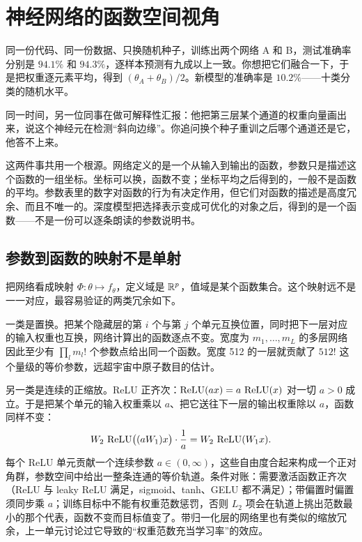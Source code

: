 \section{神经网络的函数空间视角}
\label{sec:14-Deep-Learning/10-Interpretability-Mathematics/01}

同一份代码、同一份数据、只换随机种子，训练出两个网络 A 和 B，测试准确率分别是 \(94.1\%\) 和 \(94.3\%\)，逐样本预测有九成以上一致。你想把它们融合一下，于是把权重逐元素平均，得到 \((\theta_A+\theta_B)/2\)。新模型的准确率是 \(10.2\%\)——十类分类的随机水平。

同一时间，另一位同事在做可解释性汇报：他把第三层某个通道的权重向量画出来，说这个神经元在检测``斜向边缘''。你追问换个种子重训之后哪个通道还是它，他答不上来。

这两件事共用一个根源。网络定义的是一个从输入到输出的函数，参数只是描述这个函数的一组坐标。坐标可以换，函数不变；坐标平均之后得到的，一般不是函数的平均。参数表里的数字对函数的行为有决定作用，但它们对函数的描述是高度冗余、而且不唯一的。深度模型把选择表示变成可优化的对象之后，得到的是一个函数——不是一份可以逐条朗读的参数说明书。

\subsection{参数到函数的映射不是单射}

把网络看成映射 \(\Phi:\theta\mapsto f_\theta\)，定义域是 \(\mathbb{R}^p\)，值域是某个函数集合。这个映射远不是一一对应，最容易验证的两类冗余如下。

一类是置换。把某个隐藏层的第 \(i\) 个与第 \(j\) 个单元互换位置，同时把下一层对应的输入权重也互换，网络计算出的函数逐点不变。宽度为 \(m_1,\dots,m_{L}\) 的多层网络因此至少有 \(\prod_l m_l!\) 个参数点给出同一个函数。宽度 512 的一层就贡献了 \(512!\) 这个量级的等价参数，远超宇宙中原子数目的估计。

另一类是连续的正缩放。ReLU 正齐次：\(\operatorname{ReLU}(ax)=a\,\operatorname{ReLU}(x)\) 对一切 \(a>0\) 成立。于是把某个单元的输入权重乘以 \(a\)、把它送往下一层的输出权重除以 \(a\)，函数同样不变：
\[
W_2\,\operatorname{ReLU}\bigl((aW_1)x\bigr)\cdot\frac1a=W_2\,\operatorname{ReLU}(W_1x).
\]
每个 ReLU 单元贡献一个连续参数 \(a\in(0,\infty)\)，这些自由度合起来构成一个正对角群，参数空间中给出一整条连通的等价轨道。条件对账：需要激活函数正齐次（ReLU 与 leaky ReLU 满足，sigmoid、tanh、GELU 都不满足）；带偏置时偏置须同步乘 \(a\)；训练目标中不能有权重范数惩罚，否则 \(L_2\) 项会在轨道上挑出范数最小的那个代表，函数不变而目标值变了。带归一化层的网络里也有类似的缩放冗余，上一单元讨论过它导致的``权重范数充当学习率''的效应。

